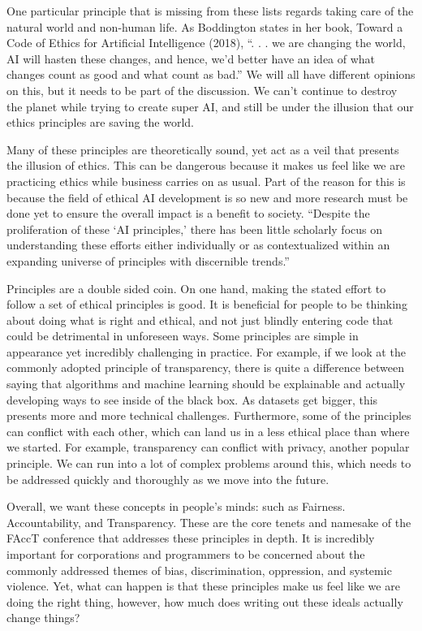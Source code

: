 \documentclass{svproc}
\begin{document}
One particular principle that is missing from these lists regards taking care of the natural world and non-human life. As Boddington states in her book, Toward a Code of Ethics for Artificial Intelligence (2018), “. . . we are changing the world, AI will hasten these changes, and hence, we’d better have an idea of what changes count as good and what count as bad.” \cite{Boddington2017TowardsIntelligence} We will all have different opinions on this, but it needs to be part of the discussion. We can’t continue to destroy the planet while trying to create super AI, and still be under the illusion that our ethics principles are saving the world. 
 
Many of these principles are theoretically sound, yet act as a veil that presents the illusion of ethics. This can be dangerous because it makes us feel like we are practicing ethics while business carries on as usual. Part of the reason for this is because the field of ethical AI development is so new and more research must be done yet to ensure the overall impact is a benefit to society. “Despite the proliferation of these ‘AI principles,’ there has been little scholarly focus on understanding these efforts either individually or as contextualized within an expanding universe of principles with discernible trends.” \cite{Fjeld2020PrincipledAI}

Principles are a double sided coin. On one hand, making the stated effort to follow a set of ethical principles is good. It is beneficial for people to be thinking about doing what is right and ethical, and not just blindly entering code that could be detrimental in unforeseen ways. Some principles are simple in appearance yet incredibly challenging in practice. For example, if we look at the commonly adopted principle of transparency, there is quite a difference between saying that algorithms and machine learning should be explainable and actually developing ways to see inside of the black box. As datasets get bigger, this presents more and more technical challenges. \cite{Boddington2017TowardsIntelligence} Furthermore, some of the principles can conflict with each other, which can land us in a less ethical place than where we started. For example, transparency can conflict with privacy, another popular principle. We can run into a lot of complex problems around this, which needs to be addressed quickly and thoroughly as we move into the future.
 
Overall, we want these concepts in people's minds: such as Fairness. Accountability, and Transparency. These are the core tenets and namesake of the FAccT conference \cite{2022ACMConference} that addresses these principles in depth. It is incredibly important for corporations and programmers to be concerned about the commonly addressed themes of bias, discrimination, oppression, and systemic violence. Yet, what can happen is that these principles make us feel like we are doing the right thing, however, how much does writing out these ideals actually change things? 
\end{document}
